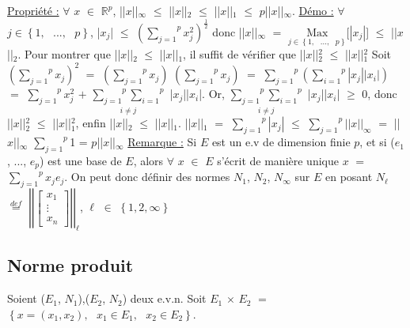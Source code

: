 \documentclass{article}
\begin{document}
\smallbreak
\parindent=0cm
\underline{Propriété :} $\forall$ $x$ $\in$ $\mathbb{R}^p$, ||$x$||$_{\infty}$ $\leqslant$ ||$x$||$_2$ $\leqslant$ ||$x$||$_1$ $\leqslant$ $p$||$x$||$_{\infty}$.
\smallbreak
\underline{Démo :} \parindent=1cm $\forall$ $j \in \left\{ 1,\text{ }...,\text{ }p \right\} $, |$x_j$| $\leqslant$ $\left(\overset{p}{\underset{j = 1}{\sum}} x_j^2\right)^{\frac{1}{2}}$ donc ||$x$||$_{\infty}$ $=$ $\underset{j \in \left\{ 1,\text{ }...,\text{ }p \right\} }{\text{Max}}$[$|x_j|$] $\leqslant$ ||$x$||$_2$.
\smallbreak
Pour montrer que ||$x$||$_2$ $\leqslant$ ||$x$||$_1$, il suffit de vérifier que ||$x$||$_2^2$ $\leqslant$ ||$x$||$_1^2$
\smallbreak
Soit $\left( \overset{p}{\underset{j = 1}{\sum}} x_j\right)^2$ $=$ $\left( \overset{p}{\underset{j = 1}{\sum}} x_j\right)$ $\left(\overset{p}{\underset{j = 1}{\sum}} x_j\right)$ $=$ $\overset{p}{\underset{j = 1}{\sum}}\left( \overset{p}{\underset{i = 1}{\sum}} |x_j||x_i|\right)$ $=$ $\overset{p}{\underset{j = 1}{\sum}} x_j^2$ $+$ $\underset{i \neq j}{\overset{p}{\underset{j = 1}{\sum}} \overset{p}{\underset{i = 1}{\sum}}}$ |$x_j$||$x_i$|. Or, $\underset{i \neq j}{\overset{p}{\underset{j = 1}{\sum}} \overset{p}{\underset{i = 1}{\sum}}}$ |$x_j$||$x_i$| $\geqslant$ $0$, donc \smallbreak ||$x$||$_2^2$ $\leqslant$ ||$x$||$_1^2$, enfin ||$x$||$_2$ $\leqslant$ ||$x$||$_1$.
\smallbreak
||$x$||$_1$ $=$ $\overset{p}{\underset{j = 1}{\sum}}|x_j|$ $\leqslant$ $\overset{p}{\underset{j = 1}{\sum}}||x||_{\infty} $ $=$ ||$x$||$_{\infty}$ $\overset{p}{\underset{j = 1}{\sum}} $1 = $p$||$x$||$_{\infty}$
\smallbreak
\parindent=0cm
\underline{Remarque :} \parindent=1cm \smallbreak Si $E$ est un e.v de dimension finie $p$, et si ($e_1$, ..., $e_p$) est une base de $E$, alors $\forall$ $x$ $\in$ $E$ s'écrit de \smallbreak manière unique $x$ $=$ $\overset{p}{\underset{j = 1}{\sum}}x_j e_j$. On peut donc définir des normes $N_1$, $N_2$, $N_{\infty}$ sur $E$ en posant \smallbreak $N_{\ell}$ $\overset{ def }{=}$ $\left| \left|
\begin{bmatrix}
	x_1 \\
	\vdots \\
	x_n
\end{bmatrix}
\right| \right|_{\ell}$, $\ell$ $\in$ $\left\{1, 2, \infty \right\}$

\subsection{Norme produit}
\parindent=0cm
Soient ($E_1$, $N_1$),($E_2$, $N_2$) deux e.v.n. Soit $E_1$ $\times$ $E_2$ $=$ $\left\{ x = (x_1, x_2),\text{ }  x_1 \in E_1,\text{ } x_2 \in E_2 \right\}$. 
\end{document}

